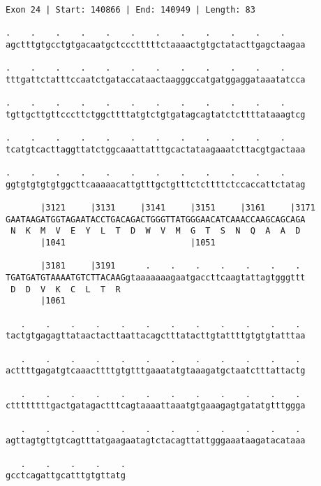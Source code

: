 \documentclass{article}
\begin{document}
\begin{Verbatim}[fontfamily=courier]
Exon 24 | Start: 140866 | End: 140949 | Length: 83

.    .    .    .    .    .    .    .    .    .    .    .    
agctttgtgcctgtgacaatgctccctttttctaaaactgtgctatacttgagctaagaa

.    .    .    .    .    .    .    .    .    .    .    .    
tttgattctatttccaatctgataccataactaagggccatgatggaggataaatatcca

.    .    .    .    .    .    .    .    .    .    .    .    
tgttgcttgttcccttctggcttttatgtctgtgatagcagtatctcttttataaagtcg

.    .    .    .    .    .    .    .    .    .    .    .    
tcatgtcacttaggttatctggcaaattatttgcactataagaaatcttacgtgactaaa

.    .    .    .    .    .    .    .    .    .    .    .    
ggtgtgtgtgtggcttcaaaaacattgtttgctgtttctcttttctccaccattctatag

       |3121     |3131     |3141     |3151     |3161     |3171
GAATAAGATGGTAGAATACCTGACAGACTGGGTTATGGGAACATCAAACCAAGCAGCAGA
 N  K  M  V  E  Y  L  T  D  W  V  M  G  T  S  N  Q  A  A  D 
       |1041                         |1051                  

       |3181     |3191      .    .    .    .    .    .    . 
TGATGATGTAAAATGTCTTACAAGgtaaaaaaagaatgaccttcaagtattagtgggttt
 D  D  V  K  C  L  T  R                                     
       |1061                                                

   .    .    .    .    .    .    .    .    .    .    .    . 
tactgtgagagttataactacttaattacagctttatacttgtattttgtgtgtatttaa

   .    .    .    .    .    .    .    .    .    .    .    . 
acttttgagatgtcaaacttttgtgtttgaaatatgtaaagatgctaatctttattactg

   .    .    .    .    .    .    .    .    .    .    .    . 
cttttttttgactgatagactttcagtaaaattaaatgtgaaagagtgatatgtttggga

   .    .    .    .    .    .    .    .    .    .    .    . 
agttagtgttgtcagtttatgaagaatagtctacagttattgggaaataagatacataaa

   .    .    .    .    .
gcctcagattgcatttgtgttatg
\end{Verbatim}
\newpage
\end{document}
